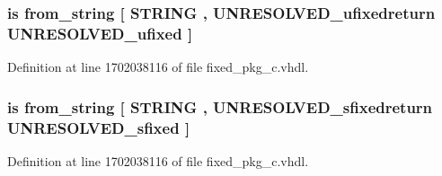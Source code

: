 \subsubsection[{from\+\_\+binary\+\_\+string}]{ {\bfseries \textcolor{keywordflow}{is}\textcolor{vhdlchar}{ }\textcolor{vhdlchar}{from\+\_\+string}\textcolor{vhdlchar}{ }\textcolor{vhdlchar}{\mbox{[}}\textcolor{vhdlchar}{ }\textcolor{comment}{S\+T\+R\+I\+N\+G}\textcolor{vhdlchar}{ }\textcolor{vhdlchar}{,}\textcolor{vhdlchar}{ }\textcolor{vhdlchar}{U\+N\+R\+E\+S\+O\+L\+V\+E\+D\+\_\+ufixedreturn}\textcolor{vhdlchar}{ }{\bfseries {\bf U\+N\+R\+E\+S\+O\+L\+V\+E\+D\+\_\+ufixed}} \textcolor{vhdlchar}{ }\textcolor{vhdlchar}{\mbox{]}}\textcolor{vhdlchar}{ }} \hspace{0.3cm}{\ttfamily [Alias]}}\label{classfixed__pkg_aafa4d3f9d3a16fe18448d65ee36e70c7}


Definition at line 1702038116 of file fixed\+\_\+pkg\+\_\+c.\+vhdl.

\hypertarget{classfixed__pkg_a580a78b7c4cd63422b9a571293d8e018}{}
\subsubsection[{from\+\_\+binary\+\_\+string}]{ {\bfseries \textcolor{keywordflow}{is}\textcolor{vhdlchar}{ }\textcolor{vhdlchar}{from\+\_\+string}\textcolor{vhdlchar}{ }\textcolor{vhdlchar}{\mbox{[}}\textcolor{vhdlchar}{ }\textcolor{comment}{S\+T\+R\+I\+N\+G}\textcolor{vhdlchar}{ }\textcolor{vhdlchar}{,}\textcolor{vhdlchar}{ }\textcolor{vhdlchar}{U\+N\+R\+E\+S\+O\+L\+V\+E\+D\+\_\+sfixedreturn}\textcolor{vhdlchar}{ }{\bfseries {\bf U\+N\+R\+E\+S\+O\+L\+V\+E\+D\+\_\+sfixed}} \textcolor{vhdlchar}{ }\textcolor{vhdlchar}{\mbox{]}}\textcolor{vhdlchar}{ }} \hspace{0.3cm}{\ttfamily [Alias]}}\label{classfixed__pkg_a580a78b7c4cd63422b9a571293d8e018}


Definition at line 1702038116 of file fixed\+\_\+pkg\+\_\+c.\+vhdl.

\hypertarget{classfixed__pkg_a8e105c4593830f93742f43539e13c450}{}
